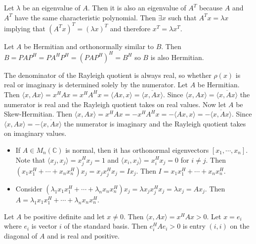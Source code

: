 \documentclass[12pt]{article}
\newenvironment{problem}[2][Problem]{\begin{trivlist}
\item[\hskip \labelsep {\bfseries #1}\hskip \labelsep {\bfseries #2}]}{\end{trivlist}}
\begin{document}
\begin{problem}{18.} 
Let $\lambda$ be an eigenvalue of $A$. Then it is also an eigenvalue of $A^T$ because $A$ and $A^T$ have the same characteristic polynomial. Then $\exists x$ such that $A^Tx = \lambda x$ implying that  $(A^Tx)^T = (\lambda x)^T$ and therefore $x^T = \lambda x^T$. 
\end{problem}

\begin{problem}{20.} 
Let $A$ be Hermitian and orthonormally similar to $B$. Then $B = PAP^H = PA^HP^H = (PAP^H)^H = B^H$ so $B$ is also Hermitian. 
\end{problem}

\begin{problem}{24.} 
The denominator of the Rayleigh quotient is always real, so whether $\rho(x)$ is real or imaginary is determined solely by the numerator. 
Let $A$ be Hermitian. Then $\langle x, Ax \rangle = x^HAx = x^HA^Hx = \langle Ax, x \rangle = \overline{ \langle x, Ax \rangle}$. Since $\langle x, Ax \rangle = \overline{ \langle x, Ax \rangle}$ the numerator is real and the Rayleigh quotient takes on real values. Now let $A$ be Skew-Hermitian. Then $\langle x, Ax \rangle = x^HAx = -x^HA^Hx = - \langle Ax, x \rangle =  - \overline{ \langle x, Ax \rangle}$. Since $\langle x, Ax \rangle = - \overline{ \langle x, Ax \rangle}$ the numerator is imaginary and the Rayleigh quotient takes on imaginary values.
\end{problem}

\begin{problem}{25.}\hfill
\begin{itemize}
\item [(i)] If $A \in M_n(\mathbb{C})$ is normal, then it has orthonormal eigenvectors $[x_1,\cdots,x_n]$. Note that $\langle x_j, x_j \rangle =x_j^Hx_j = 1$ and $\langle x_i, x_j \rangle = x_i^Hx_j = 0$ for $i\neq j$. Then $(x_1x_1^H + \cdots + x_nx_n^H)x_j = x_jx_j^Hx_j = I x_j$. Then $I = x_1x_1^H + \cdots + x_nx_n^H$. 
\item [(ii)] Consider $(\lambda_1x_1x_1^H + \cdots + \lambda_nx_nx_n^H)x_j = \lambda x_j x_j^H x_j  = \lambda x_j = Ax_j$. Then $A = \lambda_1x_1x_1^H + \cdots + \lambda_nx_nx_n^H$. 
\end{itemize}
\end{problem}

\begin{problem}{27.} 
Let $A$ be positive definite and let $x \neq 0$. Then  $\langle x, Ax \rangle = x^HAx > 0$. Let $x = e_i$ where $e_i$ is vector $i$ of the standard basis. Then $e_i^HAe_i > 0$ is entry $(i,i)$ on the diagonal of $A$ and is real and positive. 
\end{problem}
\end{document}
